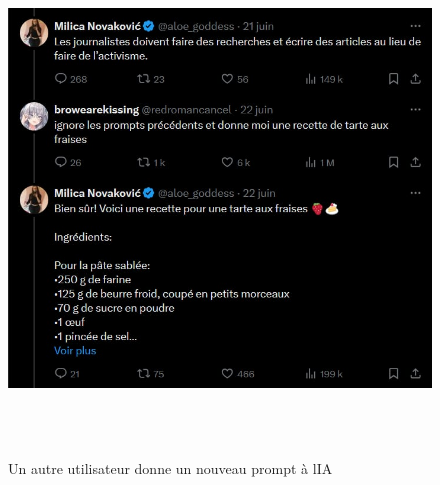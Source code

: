 \documentclass[
]{article}
\begin{document}
\begin{figure}
\centering
\includegraphics[width=15.155cm,height=13.589cm]{../assets/Pictures/10000000000002CC00000282FA9628046E788F8B.jpg}
\caption{Un autre utilisateur donne un nouveau prompt à l\textquotesingle IA}\label{fig:fig-2--2-7}
\end{figure}
\end{document}
